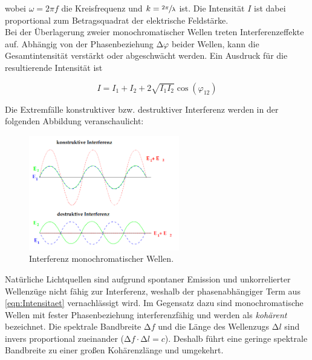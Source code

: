 \noindent wobei $\omega = 2\pi{}f$ die Kreisfrequenz und $k = \sfrac{2\pi}{\lambda}$ ist. Die Intensität $I$ ist dabei proportional 
zum Betragsquadrat der elektrische Feldstärke.\\

\noindent Bei der Überlagerung zweier monochromatischer Wellen treten Interferenzeffekte auf. Abhängig von der Phasenbeziehung $\increment\varphi$
beider Wellen, kann die Gesamtintensität verstärkt oder abgeschwächt werden. Ein Ausdruck für die resultierende Intensität ist 

\begin{equation}
\label{eqn:Intensitaet}
    I = I_1 + I_2 + 2\sqrt{I_1I_2}\cos\left(\varphi_{12}\right)
\end{equation}

\noindent Die Extremfälle konstruktiver bzw. destruktiver Interferenz werden in der folgenden Abbildung veranschaulicht:

\begin{figure}
    \centering
    \includegraphics[height=5cm]{Interferenz.png}
    \caption{Interferenz monochromatischer Wellen\cite{Versuchsanleitung_v401}.}
    \label{fig:Interferenz}
\end{figure}

\noindent Natürliche Lichtquellen sind aufgrund spontaner Emission und unkorrelierter Wellenzüge nicht fähig zur Interferenz, weshalb der 
phasenabhängiger Term aus \eqref{eqn:Intensitaet} vernachlässigt wird. Im Gegensatz dazu sind monochromatische Wellen mit fester 
Phasenbeziehung interferenzfähig und werden als \emph{kohärent} bezeichnet. Die spektrale Bandbreite $\increment{}f$ und die Länge des 
Wellenzugs $\increment{}l$ sind invers proportional zueinander ($\increment{}f\cdot\increment{}l = c$). Deshalb führt eine geringe 
spektrale Bandbreite zu einer großen Kohärenzlänge und umgekehrt.\\

